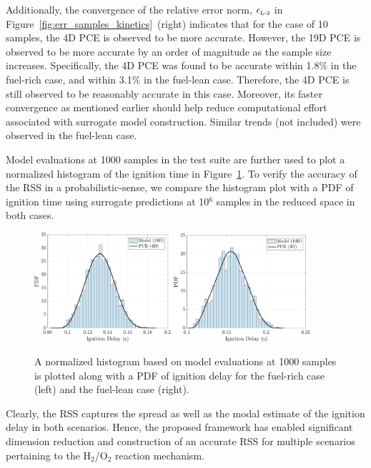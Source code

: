 Additionally, the
convergence of the relative error norm, $\epsilon_{\mbox{\tiny{L-2}}}$ in 
Figure~\ref{fig:err_samples_kinetics}~(right) indicates that for the case of 10
samples, the 4D PCE is observed to be more accurate. However, the 19D PCE
is observed to be more accurate by an order of magnitude as the sample size
increases. Specifically, the 4D PCE was found to be accurate within 1.8$\%$ in the
fuel-rich case, and within 3.1$\%$ in the fuel-lean case. Therefore, the 4D PCE
is still observed to be reasonably accurate in this case. Moreover, its faster convergence
as mentioned earlier should help reduce computational effort associated with
surrogate model construction.
Similar trends (not included) were observed in the fuel-lean case. 

Model evaluations at 1000 samples in the test suite
are further used to plot a normalized histogram of the ignition time in 
Figure~\ref{fig:pdf_kinetics}. To verify the accuracy of the RSS in a 
probabilistic-sense, we compare the histogram plot with a PDF of ignition time
using surrogate predictions at 10$^{6}$ samples in the reduced space in both cases. 
%
\begin{figure}[htbp]
 \begin{center}
  \includegraphics[width=0.45\textwidth]{./Figures/pdf_comp_rich}
  \includegraphics[width=0.45\textwidth]{./Figures/pdf_comp_lean}
\caption{A normalized histogram based on model evaluations at 1000 samples is plotted
along with a PDF of ignition delay for the fuel-rich case (left) and the fuel-lean
case (right).}
\label{fig:pdf_kinetics}
\end{center}
\end{figure}
%
Clearly, the RSS captures the spread as well as the modal estimate of
the ignition delay in both scenarios. Hence, the proposed framework 
has enabled significant dimension reduction and construction of an accurate
RSS for multiple scenarios pertaining to the H$_2$/O$_2$ reaction
mechanism.    



